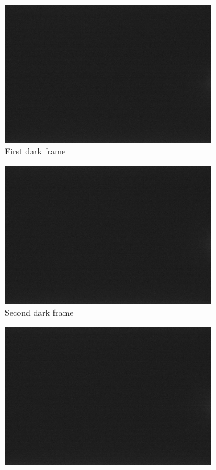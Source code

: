 \begin{figure}[h]
\captionsetup[subfigure]{justification=centering}
\captionsetup{justification=centering}
    \centering
	\begin{subfigure}{0.49\textwidth}
		\includegraphics[width=1\linewidth]{appendix/img/campaign_results/d0.jpeg}
		\caption{First dark frame}
		\label{fig:sub:d0}
	\end{subfigure}
	\begin{subfigure}{0.49\textwidth}
		\includegraphics[width=1\linewidth]{appendix/img/campaign_results/d1.jpeg}
		\caption{Second dark frame}
		\label{fig:sub:d1}
	\end{subfigure}
	\begin{subfigure}{0.49\textwidth}
		\includegraphics[width=1\linewidth]{appendix/img/campaign_results/d2.jpeg}

\end{subfigure}
\end{figure}
